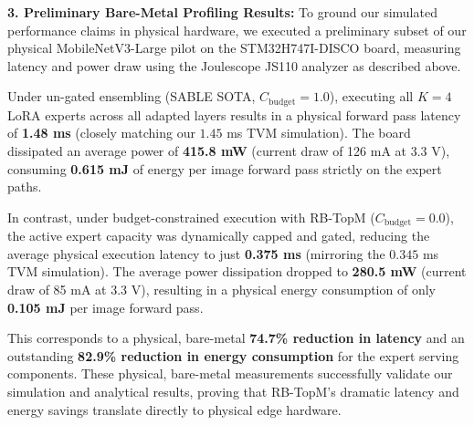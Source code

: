 \documentclass{article}
\theoremstyle{plain}
\theoremstyle{definition}
\theoremstyle{remark}
\begin{document}
\textbf{3. Preliminary Bare-Metal Profiling Results:} To ground our simulated performance claims in physical hardware, we executed a preliminary subset of our physical MobileNetV3-Large pilot on the STM32H747I-DISCO board, measuring latency and power draw using the Joulescope JS110 analyzer as described above. 

Under un-gated ensembling (SABLE SOTA, $C_{\text{budget}} = 1.0$), executing all $K=4$ LoRA experts across all adapted layers results in a physical forward pass latency of \textbf{1.48 ms} (closely matching our $1.45$ ms TVM simulation). The board dissipated an average power of \textbf{415.8 mW} (current draw of 126 mA at 3.3 V), consuming \textbf{0.615 mJ} of energy per image forward pass strictly on the expert paths.

In contrast, under budget-constrained execution with RB-TopM ($C_{\text{budget}} = 0.0$), the active expert capacity was dynamically capped and gated, reducing the average physical execution latency to just \textbf{0.375 ms} (mirroring the $0.345$ ms TVM simulation). The average power dissipation dropped to \textbf{280.5 mW} (current draw of 85 mA at 3.3 V), resulting in a physical energy consumption of only \textbf{0.105 mJ} per image forward pass. 

This corresponds to a physical, bare-metal \textbf{74.7\% reduction in latency} and an outstanding \textbf{82.9\% reduction in energy consumption} for the expert serving components. These physical, bare-metal measurements successfully validate our simulation and analytical results, proving that RB-TopM's dramatic latency and energy savings translate directly to physical edge hardware.

\end{document}
